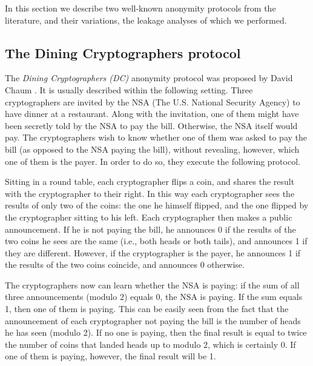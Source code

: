 In this section we describe two well-known anonymity protocols 
from the literature, and their variations, 
the leakage analyses of which we performed. 
%

\subsection{The Dining Cryptographers protocol}

The \emph{Dining Cryptographers (DC)} anonymity protocol was proposed by 
David Chaum \cite{dining}. 
It is usually described within the following setting. 
Three cryptographers are invited by the NSA 
(The U.S. National Security Agency) to have dinner at a restaurant. 
Along with the invitation, one of them might have been secretly told by 
the NSA to pay the bill. 
Otherwise, the NSA itself would pay. 
The cryptographers wish to know whether one of them was asked to pay the bill
(as opposed to the NSA paying the bill), without revealing, however, which 
one of them is the payer. 
In order to do so, they execute the following protocol. 

Sitting in a round table, each cryptographer flips a coin, and shares the 
result with the cryptographer to their right. 
In this way each cryptographer sees the results of only two of the coins: the one he 
himself flipped, and the one flipped by the cryptographer sitting to his 
left. 
Each cryptographer then makes a public announcement. 
If he is not paying the bill, he announces 0 if the results of the two coins he
sees are the same (i.e., both heads or both tails), and announces 1 if they are 
different. 
However, if the cryptographer is the payer, he announces 1 if the results of the 
two coins coincide, and announces 0 otherwise.

The cryptographers now can learn whether the NSA is paying: 
if the sum of all three announcements (modulo 2) equals 0, 
the NSA is paying. 
If the sum equals 1, then one of them is paying. 
This can be easily seen from the fact that the announcement of 
each cryptographer not paying the bill is the number of heads he 
has seen (modulo 2). 
If no one is paying, then the final result is equal to twice the 
number of coins that landed heads up to modulo 2, which is certainly 0. 
If one of them is paying, however, the final result will be 1.

